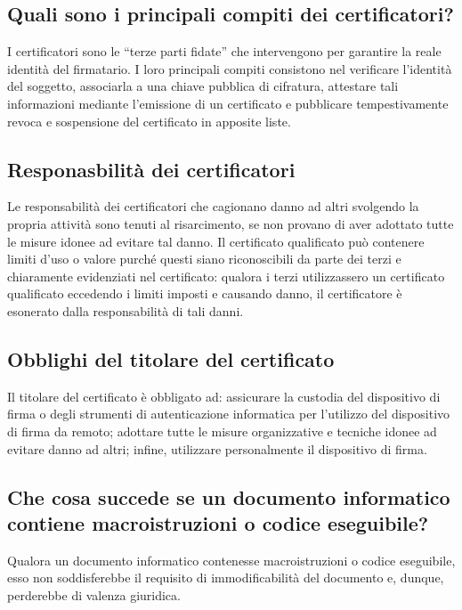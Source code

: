 \subsection{Quali sono i principali compiti dei certificatori?}
I certificatori sono le “terze parti fidate” che intervengono
per garantire la reale identità del firmatario. I loro principali compiti consistono nel
verificare l’identità del soggetto, associarla a una chiave pubblica di cifratura,
attestare tali informazioni mediante l’emissione di un certificato e pubblicare tempestivamente revoca
e sospensione del certificato in apposite liste.


\subsection{Responasbilità dei certificatori}
Le responsabilità dei certificatori che cagionano danno ad altri svolgendo la propria
attività sono tenuti al risarcimento, se non provano di aver adottato tutte
le misure idonee ad evitare tal danno. Il certificato qualificato può contenere limiti
d’uso o valore purché questi siano riconoscibili da parte dei terzi e chiaramente
evidenziati nel certificato: qualora i terzi utilizzassero un certificato qualificato
eccedendo i limiti imposti e causando danno, il certificatore è esonerato dalla responsabilità di tali danni.


\subsection{Obblighi del titolare del certificato}
Il titolare del certificato è obbligato ad: assicurare
la custodia del dispositivo di firma o degli strumenti di autenticazione
informatica per l’utilizzo del dispositivo di firma da remoto;
adottare tutte le misure organizzative e tecniche idonee ad evitare danno ad altri; infine,
utilizzare personalmente il dispositivo di firma.

\subsection{Che cosa succede se un documento informatico contiene macroistruzioni o codice eseguibile?}
Qualora un documento informatico contenesse macroistruzioni o codice eseguibile, esso non soddisferebbe
il requisito di immodificabilità del documento e, dunque, perderebbe di valenza giuridica.


